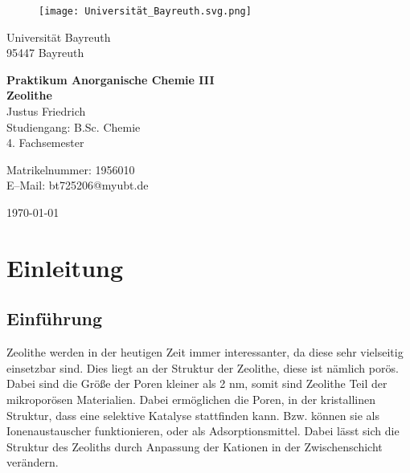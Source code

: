 \documentclass[12pt, a4paper]{article}
\begin{document}
\begin{figure}
    \texttt{[image: Universität\_Bayreuth.svg.png]}
\end{figure}



{\raggedright Universität Bayreuth\\  95447 Bayreuth}


\vspace{5cm}

\begin{center}
{\LARGE\bf{Praktikum Anorganische Chemie III}} \\  
\vspace{1cm}
{\Large\bf{Zeolithe}}\\
\vspace{0.5cm}
{\large Justus Friedrich\\}
{Studiengang: B.Sc. Chemie\\}
{4. Fachsemester}
\end{center}





\thispagestyle{empty}
\begin{center}
{\small Matrikelnummer: 1956010 \\
E–Mail:  bt725206@myubt.de}
\end{center}

\vspace{5cm}

\begin{center}
  \today
\end{center}


\newpage
\tableofcontents
\thispagestyle{empty}


\newpage
\setcounter{page}{1}
\section{Einleitung}



\subsection{Einführung}
{
Zeolithe werden in der heutigen Zeit immer interessanter, da diese sehr vielseitig einsetzbar sind. 
Dies liegt an der Struktur der Zeolithe, diese ist nämlich porös. Dabei sind die Größe der Poren kleiner als 
2 nm, somit sind Zeolithe Teil der mikroporösen Materialien. Dabei ermöglichen die Poren, in der kristallinen
Struktur, dass eine selektive Katalyse stattfinden kann. Bzw. können sie als Ionenaustauscher
funktionieren, oder als Adsorptionsmittel. Dabei lässt sich die Struktur des Zeoliths durch Anpassung der Kationen 
in der Zwischenschicht verändern.\cite{riedel}
}
\end{document}
